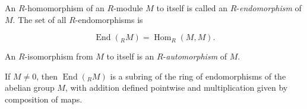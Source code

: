 An $R$-homomorphism of an $R$-module $M$ to itself is called an $R$-\textit{endomorphism} of $M$. The set of all $R$-endomorphisms is

$$\operatorname{End}(_R M) = \operatorname{Hom}_R(M, M).$$

An $R$-isomorphism from $M$ to itself is an $R$-\textit{automorphism} of $M$.

If $M \neq 0$, then $\operatorname{End}(_R M)$ is a subring of the ring of endomorphisms of the abelian group $M$, with addition defined pointwise and multiplication given by composition of maps.
